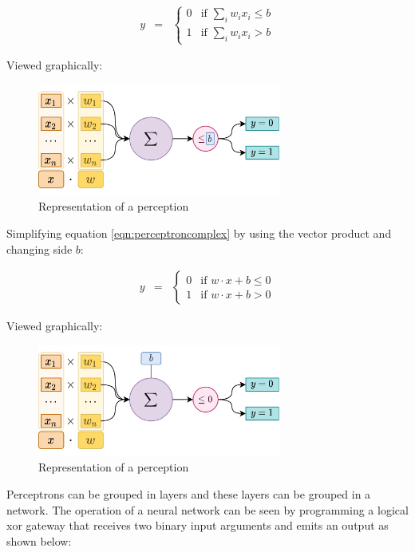 \begin{eqnarray}
  y & = & \left\{ \begin{array}{ll}
      0 & \mbox{if } \sum_i w_i x_i \leq b \\
      1 & \mbox{if } \sum_i w_i x_i > b
      \end{array} \right.
      \label{eqn:perceptroncomplex}
\end{eqnarray}


Viewed graphically:
\begin{figure}[H]
    \centering
    \includegraphics[width=8cm]{images/state-of-art/perceptron/perceptron_weights.png}
    \caption{Representation of a perception}
    \label{fig:perceptron}
\end{figure}

Simplifying equation \ref{eqn:perceptroncomplex} by using the vector product and changing side $b$:

\begin{eqnarray}
  y & = & \left\{ \begin{array}{ll}
      0 & \mbox{if } w \cdot x + b \leq 0 \\
      1 & \mbox{if } w \cdot x + b > 0
      \end{array} \right.
      \label{eqn:perceptron}
\end{eqnarray}

Viewed graphically:
\begin{figure}[H]
    \centering
    \includegraphics[width=8cm]{images/state-of-art/perceptron/perceptron_weights_complex.png}
    \caption{Representation of a perception}
    \label{fig:perceptron}
\end{figure}


Perceptrons can be grouped in layers and these layers can be grouped in a network. The operation of a neural network can be seen by programming a logical \acrshort{xor} gateway that receives two binary input arguments and emits an output as shown below:

